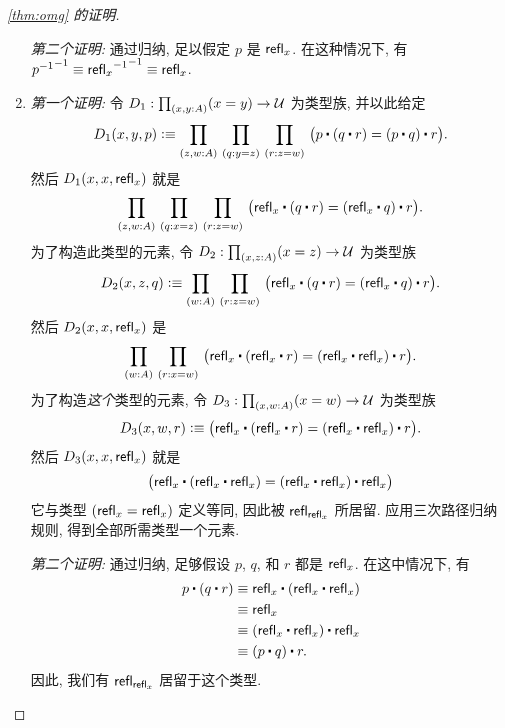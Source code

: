 \begin{proof}[\cref{thm:omg} 的证明]
\begin{enumerate}
        \mentalpause

        \noindent \emph{第二个证明:} 通过归纳, 足以假定 $p$ 是 $\mathsf{refl}_{x}$.
        在这种情况下, 有 $\mathord{{\mathord{{p}^{-1}}}^{-1}}\equiv \mathord{{\mathord{{\mathsf{refl}_{x}}^{-1}}}^{-1}} \equiv \mathsf{refl}_{x}$.

        \item \emph{第一个证明:} 令 $D_1:\prd{x,y:A} (x=y) \to \type$ 为类型族, 并以此给定
        \begin{equation*}
            D_1(x,y,p)\defeq\prd{z,w:A}{q:y= z}{r:z= w} \big(p\ct (q\ct r)= (p\ct q)\ct r\big).
        \end{equation*}
        然后 $D_1(x,x,\mathsf{refl}_{x})$ 就是
        \begin{equation*}
            \prd{z,w:A}{q:x= z}{r:z= w} \big(\refl{x}\ct(q\ct r)= (\refl{x}\ct q)\ct r\big).
        \end{equation*}
        为了构造此类型的元素, 令 $D_2:\prd{x,z:A} (x=z) \to \type$ 为类型族
        \begin{equation*}
            D_2 (x,z,q) \defeq \prd{w:A}{r:z=w} \big(\refl{x}\ct(q\ct r)= (\refl{x}\ct q)\ct r\big).
        \end{equation*}
        然后 $D_2(x,x,\mathsf{refl}_{x})$ 是
        \begin{equation*}
            \prd{w:A}{r:x=w} \big(\refl{x}\ct(\refl{x}\ct r)= (\refl{x}\ct \refl{x})\ct r\big).
        \end{equation*}
        为了构造\emph{这个}类型的元素, 令 $D_3:\prd{x,w:A} (x=w) \to \type$ 为类型族
        \begin{equation*}
            D_3(x,w,r) \defeq \big(\refl{x}\ct(\refl{x}\ct r)= (\refl{x}\ct \refl{x})\ct r\big).
        \end{equation*}
        然后 $D_3(x,x,\mathsf{refl}_{x})$ 就是
        \begin{equation*}
            \big(\refl{x}\ct(\refl{x}\ct \refl{x})= (\refl{x}\ct \refl{x})\ct \refl{x}\big)
        \end{equation*}
        它与类型 $(\mathsf{refl}_{x} = \mathsf{refl}_{x})$ 定义等同, 因此被 $\mathsf{refl}_{\mathsf{refl}_{x}}$ 所居留.
        应用三次路径归纳规则, 得到全部所需类型一个元素.

        \mentalpause

        \noindent \emph{第二个证明:} 通过归纳, 足够假设 $p$, $q$, 和 $r$ 都是 $\mathsf{refl}_{x}$.
        在这中情况下, 有
        \begin{align*}
            p\ct (q\ct r)
            &\jdeq \refl{x}\ct(\refl{x}\ct \refl{x})\\
            &\jdeq \refl{x}\\
            &\jdeq (\refl{x}\ct \refl x)\ct \refl x\\
            &\jdeq (p\ct q)\ct r.
        \end{align*}
        因此, 我们有 $\mathsf{refl}_{\mathsf{refl}_{x}}$ 居留于这个类型. \qedhere
    \end{enumerate}
\end{proof}

